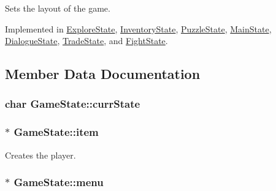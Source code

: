 Sets the layout of the game. 



Implemented in \hyperlink{classExploreState_a8fb38f9fca513b87d914d077a0f2652b}{Explore\-State}, \hyperlink{classInventoryState_a47936e9d5683d344e87f3da176e97e4b}{Inventory\-State}, \hyperlink{classPuzzleState_a966b0f168ff5499f247c9ab519b524ab}{Puzzle\-State}, \hyperlink{classMainState_ac01eced9d617c8c8f5382a9aa96adb45}{Main\-State}, \hyperlink{classDialogueState_a203e463dc924a2492db74b749b81b9f1}{Dialogue\-State}, \hyperlink{classTradeState_af0d9fdcd649c1e74620dc77a4b8f92f9}{Trade\-State}, and \hyperlink{classFightState_a853f6d2a9caf7343b8d75165e44bf5c1}{Fight\-State}.



\subsection{Member Data Documentation}
\hypertarget{classGameState_a541915faaaac7068797345cce53deb9c}{
\subsubsection[{curr\-State}]{\setlength{\rightskip}{0pt plus 5cm}char Game\-State\-::curr\-State\hspace{0.3cm}{\ttfamily [protected]}}}\label{classGameState_a541915faaaac7068797345cce53deb9c}
\hypertarget{classGameState_a11e8a5472e771f3a2eb84d38a0a95a72}{
\subsubsection[{item}]{$\ast$ Game\-State\-::item}}\label{classGameState_a11e8a5472e771f3a2eb84d38a0a95a72}


Creates the player. 

\hypertarget{classGameState_aebc12d6e90edfbe51a571858f6288f93}{
\subsubsection[{menu}]{$\ast$ Game\-State\-::menu\hspace{0.3cm}{\ttfamily [protected]}}}\label{classGameState_aebc12d6e90edfbe51a571858f6288f93}


